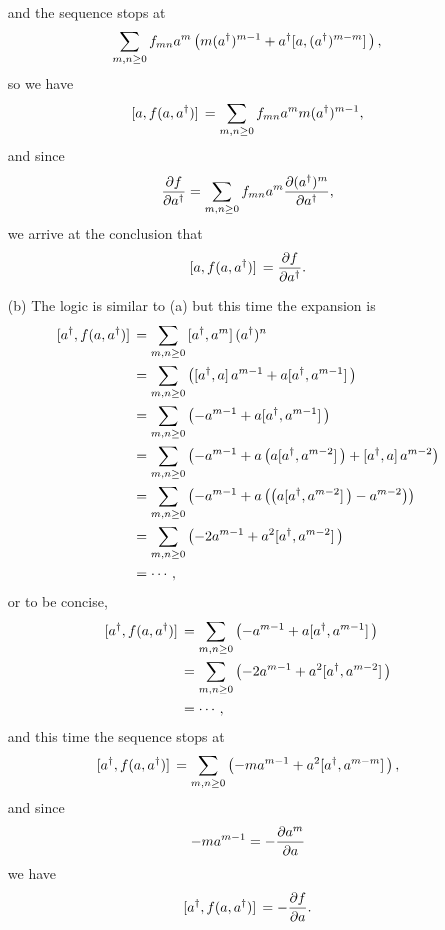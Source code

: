 \documentclass[hyperref, a4paper]{article}
\begin{document}
\begin{itemize}
\[\begin{aligned}
    \end{aligned}
\]
and the sequence stops at 
\[
    \sum_{m, n \geq 0} f_{mn} a^m \left( m (a^\dagger)^{m-1} + a^\dagger \comm*{a}{(a^\dagger)^{m-m}} \right),
\] 
so we have 
\[
    \comm*{a}{f(a, a^\dagger)} = \sum_{m, n \geq 0} f_{mn} a^m m (a^\dagger)^{m-1} ,
\] 
and since 
\[
    \pdv{f}{a^\dagger} = \sum_{m, n \geq 0} f_{mn} a^m \pdv{(a^\dagger)^m}{a^\dagger},
\]
we arrive at the conclusion that
\begin{equation}
    \comm*{a}{f(a, a^\dagger)} = \pdv{f}{a^\dagger}.
\end{equation}
\item[(b)] The logic is similar to (a) but this time the expansion is
\[
    \begin{aligned}
        \comm*{a^\dagger}{f(a, a^\dagger)} &= \sum_{m, n \geq 0} \comm*{a^\dagger}{a^m} (a^\dagger)^n \\
        &= \sum_{m, n \geq 0} \left( \comm*{a^\dagger}{a} a^{m-1} + a \comm*{a^\dagger}{a^{m-1}} \right) \\
        &= \sum_{m, n \geq 0} \left( - a^{m-1} + a \comm*{a^\dagger}{a^{m-1}} \right) \\
        &= \sum_{m, n \geq 0} \left( - a^{m-1} + a \left( a \comm*{a^\dagger}{a^{m-2}} \right) + \comm*{a^\dagger}{a} a^{m-2} \right) \\
        &= \sum_{m, n \geq 0} \left( - a^{m-1} + a \left( \left( a \comm*{a^\dagger}{a^{m-2}} \right) - a^{m-2} \right) \right) \\
        &= \sum_{m, n \geq 0} \left( - 2 a^{m-1} + a^2 \comm*{a^\dagger}{a^{m-2}} \right) \\
        &= \cdots,
    \end{aligned}
\]
or to be concise, 
\[
    \begin{aligned}
        \comm*{a^\dagger}{f(a, a^\dagger)} &= \sum_{m, n \geq 0} \left( - a^{m-1} + a \comm*{a^\dagger}{a^{m-1}} \right) \\
        &= \sum_{m, n \geq 0} \left( - 2 a^{m-1} + a^2 \comm*{a^\dagger}{a^{m-2}} \right) \\
        &= \cdots,
    \end{aligned}
\]
and this time the sequence stops at
\[
    \comm*{a^\dagger}{f(a, a^\dagger)} = \sum_{m, n \geq 0} \left( - m a^{m-1} + a^2 \comm*{a^\dagger}{a^{m-m}} \right),
\]
and since 
\[
    - m a^{m-1} = - \pdv{a^m}{a}
\]
we have
\begin{equation}
    \comm*{a^\dagger}{f(a, a^\dagger)} = - \pdv{f}{a}.
\end{equation}

\end{itemize}
\end{document}
